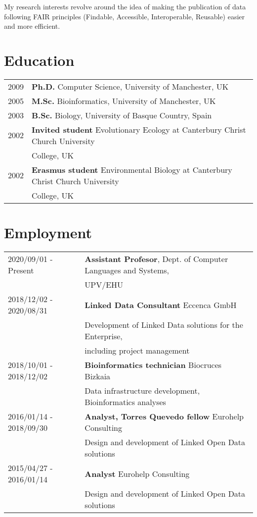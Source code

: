 \documentclass[11pt,fullpage]{article}
\begin{document}
My research interests revolve around the idea of making the publication of data following FAIR principles (Findable, Accessible, Interoperable, Reusable) easier and more efficient.

\section*{Education}

\begin{tabular}{ll}
	2009 & {\bf Ph.D.} Computer Science, University of Manchester, UK \\
	2005 & {\bf M.Sc.} Bioinformatics, University of Manchester, UK \\
	2003 & {\bf B.Sc.} Biology, University of Basque Country, Spain \\
	2002 & {\bf Invited student} Evolutionary Ecology at Canterbury Christ Church University \\
	     & College, UK \\
	2002 & {\bf Erasmus student} Environmental Biology at Canterbury Christ Church University \\
	     & College, UK \\
\end{tabular}

\section*{Employment}


\begin{tabular}{ll}
2020/09/01 - Present & {\bf Assistant Profesor}, Dept. of Computer Languages and Systems, \\
                    & UPV/EHU \\
2018/12/02 - 2020/08/31 & {\bf Linked Data Consultant} Eccenca GmbH \\
      & Development of Linked Data solutions for the Enterprise, \\ 
      & including project management\\
2018/10/01 - 2018/12/02 & {\bf Bioinformatics technician} Biocruces Bizkaia \\
      & Data infrastructure development, Bioinformatics analyses \\
2016/01/14 - 2018/09/30 & {\bf Analyst, Torres Quevedo fellow} Eurohelp Consulting \\
	      & Design and development of Linked Open Data solutions\\
 2015/04/27 -  2016/01/14 & {\bf Analyst} Eurohelp Consulting \\
	    & Design and development of Linked Open Data solutions\\
\end{tabular}
\end{document}
